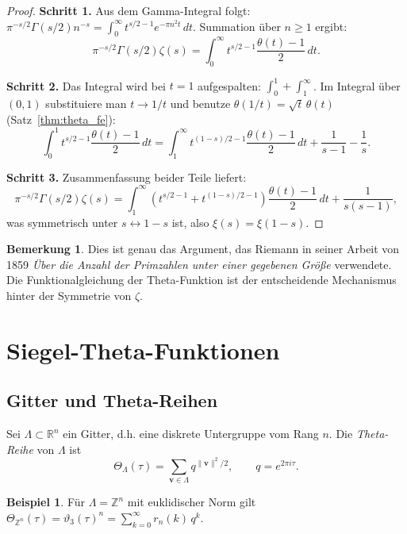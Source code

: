 \documentclass[12pt,a4paper]{amsart}
\theoremstyle{definition}
\newtheorem{example}[theorem]{Beispiel}
\newtheorem{remark}[theorem]{Bemerkung}
\begin{document}
\begin{proof}
\textbf{Schritt 1.}  Aus dem Gamma-Integral folgt:
$\pi^{-s/2}\Gamma(s/2) n^{-s} = \int_0^\infty t^{s/2-1} e^{-\pi n^2 t}\,dt$.
Summation über $n \geq 1$ ergibt:
\[
  \pi^{-s/2}\Gamma(s/2)\zeta(s)
  = \int_0^\infty t^{s/2-1} \frac{\theta(t)-1}{2}\,dt.
\]

\textbf{Schritt 2.} Das Integral wird bei $t=1$ aufgespalten:
$\int_0^1 + \int_1^\infty$.
Im Integral über $(0,1)$ substituiere man $t \to 1/t$ und benutze
$\theta(1/t) = \sqrt{t}\,\theta(t)$ (Satz~\ref{thm:theta_fe}):
\[
  \int_0^1 t^{s/2-1}\frac{\theta(t)-1}{2}\,dt
  = \int_1^\infty t^{(1-s)/2 - 1}\frac{\theta(t)-1}{2}\,dt
    + \frac{1}{s-1} - \frac{1}{s}.
\]

\textbf{Schritt 3.}  Zusammenfassung beider Teile liefert:
\[
  \pi^{-s/2}\Gamma(s/2)\zeta(s)
  = \int_1^\infty \left(t^{s/2-1}+t^{(1-s)/2-1}\right)\frac{\theta(t)-1}{2}\,dt
    + \frac{1}{s(s-1)},
\]
was symmetrisch unter $s \leftrightarrow 1-s$ ist, also $\xi(s) = \xi(1-s)$.
\end{proof}

\begin{remark}
Dies ist genau das Argument, das Riemann in seiner Arbeit von 1859
\textit{Über die Anzahl der Primzahlen unter einer gegebenen Größe} \cite{Riemann1859}
verwendete.
Die Funktionalgleichung der Theta-Funktion ist der entscheidende Mechanismus hinter
der Symmetrie von $\zeta$.
\end{remark}

\section{Siegel-Theta-Funktionen}\label{sec:siegel}

\subsection{Gitter und Theta-Reihen}

Sei $\Lambda \subset \mathbb{R}^n$ ein Gitter, d.h. eine diskrete Untergruppe vom Rang $n$.
Die \emph{Theta-Reihe} von $\Lambda$ ist
\[
  \Theta_\Lambda(\tau) = \sum_{\mathbf{v} \in \Lambda} q^{\|\mathbf{v}\|^2/2},
  \qquad q = e^{2\pi i\tau}.
\]

\begin{example}
Für $\Lambda = \mathbb{Z}^n$ mit euklidischer Norm gilt
$\Theta_{\mathbb{Z}^n}(\tau) = \vartheta_3(\tau)^n = \sum_{k=0}^\infty r_n(k)\, q^k$.
\end{example}
\end{document}
